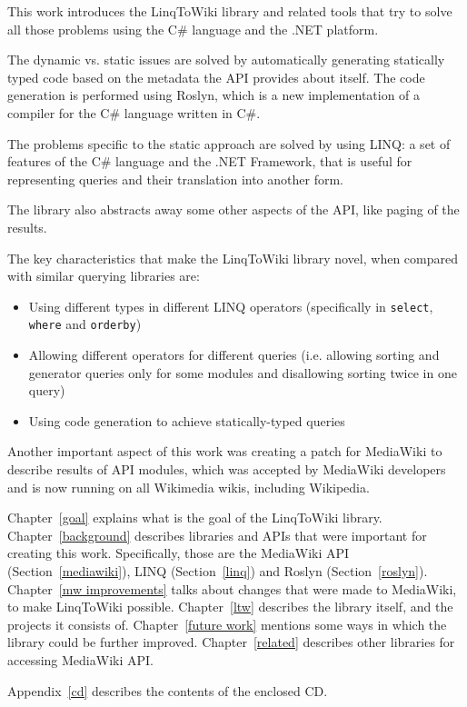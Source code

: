 \medskip

This work introduces the LinqToWiki library and related tools that try to solve all those problems
using the C\# language and the .NET platform.

The dynamic vs. static issues are solved by automatically generating statically typed
code based on the metadata the API provides about itself.
The code generation is performed using Roslyn,
which is a new implementation of a compiler for the C\# language written in C\#.

The problems specific to the static approach are solved by using \ac{LINQ}:
a set of features of the C\# language and the .NET Framework,
that is useful for representing queries and their translation into another form.

The library also abstracts away some other aspects of the \ac{API}, like paging of the results.


The key characteristics that make the LinqToWiki library novel, when compared with similar querying libraries are:

\begin{itemize}
\item Using different types in different LINQ operators
(specifically in \lstinline{select}, \lstinline{where} and \lstinline{orderby})
\item Allowing different operators for different queries
(i.e. allowing sorting and generator queries only for some modules and disallowing sorting twice in one query)
\item Using code generation to achieve statically-typed queries
\end{itemize}

Another important aspect of this work was creating a patch for MediaWiki to describe results of \ac{API} modules,
which was accepted by MediaWiki developers and is now running on all Wikimedia wikis, including Wikipedia.

Chapter~\ref{goal} explains what is the goal of the LinqToWiki library.
Chapter~\ref{background} describes libraries and \acp{API}
that were important for creating this work.
Specifically, those are the MediaWiki API (Section~\ref{mediawiki}),
LINQ (Section~\ref{linq}) and Roslyn (Section~\ref{roslyn}).
Chapter~\ref{mw improvements} talks about changes that were made to MediaWiki,
to make LinqToWiki possible.
Chapter~\ref{ltw} describes the library itself, and the projects it consists of.
Chapter~\ref{future work} mentions some ways in which the library could be further improved.
Chapter~\ref{related} describes other libraries for accessing MediaWiki API.

\medskip

Appendix~\ref{cd} describes the contents of the enclosed CD.
